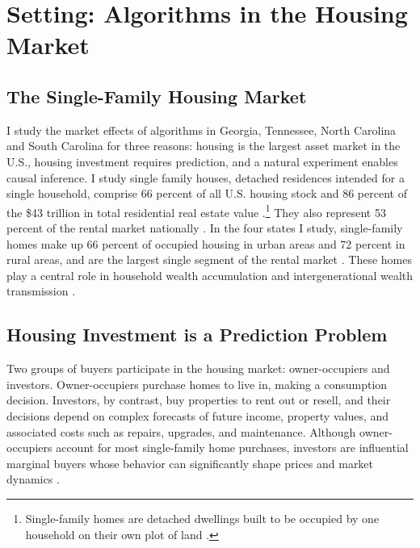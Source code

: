 \documentclass[11pt]{article}
\begin{document}
\section{Setting: Algorithms in the Housing Market}
\subsection{The Single-Family Housing Market}
I study the market effects of algorithms in Georgia, Tennessee, North Carolina and South Carolina for three reasons: housing is the largest asset market in the U.S., housing investment requires prediction, and a natural experiment enables causal inference. I study single family houses, detached residences intended for a single household, comprise 66 percent of all U.S. housing stock and 86 percent of the \$43 trillion in total residential real estate value \citep{corelogic2023, neal2020}.\footnote{Single-family homes are detached dwellings built to be occupied by one household on their own plot of land \citep{neal2020, freddiemac2018}.} They also represent 53 percent of the rental market nationally \citep{freddiemac2018}. In the four states I study, single-family homes make up 66 percent of occupied housing in urban areas and 72 percent in rural areas, and are the largest single segment of the rental market \citep{u.s.censusbureauS2504PhysicalHousing2021, censusB25, neal2020, freddiemac2018}. These homes play a central role in household wealth accumulation and intergenerational wealth transmission \citep{derenoncourtwealth2022}.



\subsection{Housing Investment is a Prediction Problem}
Two groups of buyers participate in the housing market: owner-occupiers and investors. Owner-occupiers purchase homes to live in, making a consumption decision. Investors, by contrast, buy properties to rent out or resell, and their decisions depend on complex forecasts of future income, property values, and associated costs such as repairs, upgrades, and maintenance. Although owner-occupiers account for most single-family home purchases, investors are influential marginal buyers whose behavior can significantly shape prices and market dynamics \citep{bayer_investors_2021}.
\end{document}
